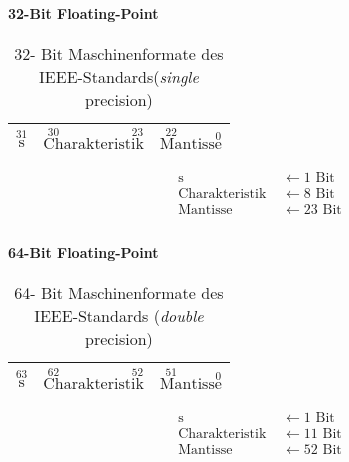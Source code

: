 \documentclass[a4paper]{scrartcl}
\begin{document}
			\paragraph{32-Bit Floating-Point}
			\begin{table}[H]
				\centering
				\begin{tabular}{|c|c|c|}
					\hline
					 \(\overset{31}{\text{s}} \)& \(\overset{30}{\text{Ch}}\text{arakterist} \overset{23}{\text{ik}}\) & \(\overset{22}{\text{Ma}} \text{ntiss} \overset{0}{\text{e}}\) \\ \hline
				\end{tabular}
				\caption{32- Bit Maschinenformate des IEEE-Standards(\emph{single} precision)}
			\end{table}
		
		\begin{align*}
		\text{s } &\gets 1 \text{ Bit} \\
		\text{Charakteristik } &\gets 8 \text{ Bit}\\
		\text{Mantisse } &\gets  23 \text{ Bit}\\
		\end{align*}
						
		\paragraph{64-Bit Floating-Point}
		\begin{table}[H]
			\centering
			\begin{tabular}{|c|c|c|}
				\hline
				\(\overset{63}{\text{s}} \)& \(\overset{62}{\text{Ch}}\text{arakterist} \overset{52}{\text{ik}}\) & \(\overset{51}{\text{Ma}} \text{ntiss} \overset{0}{\text{e}}\) \\ \hline
			\end{tabular}
			\caption{64- Bit Maschinenformate des IEEE-Standards (\emph{double} precision)}
		\end{table}
	
	\begin{align*}
	\text{s } &\gets 1 \text{ Bit} \\
	\text{Charakteristik } &\gets 11 \text{ Bit}\\
	\text{Mantisse } &\gets  52 \text{ Bit}\\
	\end{align*}
	
\end{document}

